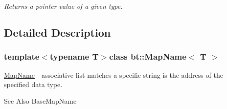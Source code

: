 \begin{DoxyCompactItemize}
\begin{DoxyCompactList}\small\item\em Returns a pointer value of a given type. \end{DoxyCompactList}\end{DoxyCompactItemize}


\subsection{Detailed Description}
\subsubsection*{template$<$typename T$>$class bt\-::\-Map\-Name$<$ T $>$}

\hyperlink{classbt_1_1_map_name}{Map\-Name} -\/ associative list matches a specific string is the address of the specified data type. 

\begin{DoxySeeAlso}{See Also}
Base\-Map\-Name 
\end{DoxySeeAlso}
